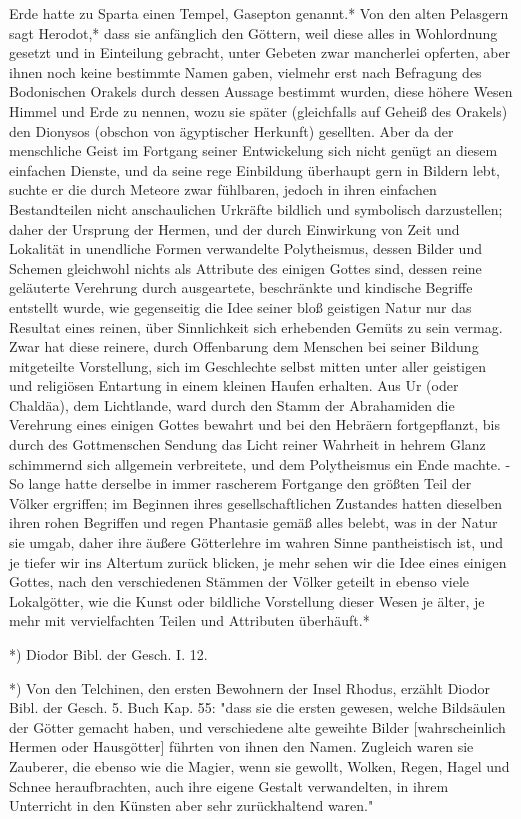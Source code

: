 \documentclass[a4paper, 11pt, oneside, polutonikogreek, german]{article}
\begin{document}
Erde hatte zu Sparta einen Tempel, Gasepton genannt.* Von den alten Pelasgern sagt Herodot,* dass sie anfänglich den Göttern, weil diese alles in Wohlordnung gesetzt und in Einteilung gebracht, unter Gebeten zwar mancherlei opferten, aber ihnen noch keine bestimmte Namen gaben, vielmehr erst nach Befragung des Bodonischen Orakels durch dessen Aussage bestimmt wurden, diese höhere Wesen Himmel und Erde zu nennen, wozu sie später (gleichfalls auf Geheiß des Orakels) den Dionysos (obschon von ägyptischer Herkunft) gesellten. Aber da der menschliche Geist im Fortgang seiner Entwickelung sich nicht genügt an diesem einfachen Dienste, und da seine rege Einbildung überhaupt gern in Bildern lebt, suchte er die durch Meteore zwar fühlbaren, jedoch in ihren einfachen Bestandteilen nicht anschaulichen Urkräfte bildlich und symbolisch darzustellen; daher der Ursprung der Hermen, und der durch Einwirkung von Zeit und Lokalität in unendliche Formen verwandelte Polytheismus, dessen Bilder und Schemen gleichwohl nichts als Attribute des einigen Gottes sind, dessen reine geläuterte Verehrung durch ausgeartete, beschränkte und kindische Begriffe entstellt wurde, wie gegenseitig die Idee seiner bloß geistigen Natur nur das Resultat eines reinen, über Sinnlichkeit sich erhebenden Gemüts zu sein vermag. Zwar hat diese reinere, durch Offenbarung dem Menschen bei seiner Bildung mitgeteilte Vorstellung, sich im Geschlechte selbst mitten unter aller geistigen und religiösen Entartung in einem kleinen Haufen erhalten. Aus Ur (oder Chaldäa), dem Lichtlande, ward durch den Stamm der Abrahamiden die Verehrung eines einigen Gottes bewahrt und bei den Hebräern fortgepflanzt, bis durch des Gottmenschen Sendung das Licht reiner Wahrheit in hehrem Glanz schimmernd sich allgemein verbreitete, und dem Polytheismus ein Ende machte. - So lange hatte derselbe in immer rascherem Fortgange den größten Teil der Völker ergriffen; im Beginnen ihres gesellschaftlichen Zustandes hatten dieselben ihren rohen Begriffen und regen Phantasie gemäß alles belebt, was in der Natur sie umgab, daher ihre äußere Götterlehre im wahren Sinne pantheistisch ist, und je tiefer wir ins Altertum zurück blicken, je mehr sehen wir die Idee eines einigen Gottes, nach den verschiedenen Stämmen der Völker geteilt in ebenso viele Lokalgötter, wie die Kunst oder bildliche Vorstellung dieser Wesen je älter, je mehr mit vervielfachten Teilen und Attributen überhäuft.*

*) Diodor Bibl. der Gesch. I. 12.

*) Von den Telchinen, den ersten Bewohnern der Insel Rhodus, erzählt Diodor Bibl. der Gesch. 5. Buch Kap. 55: "dass sie die ersten gewesen, welche Bildsäulen der Götter gemacht haben, und verschiedene alte geweihte Bilder [wahrscheinlich Hermen oder Hausgötter] führten von ihnen den Namen. Zugleich waren sie Zauberer, die ebenso wie die Magier, wenn sie gewollt, Wolken, Regen, Hagel und Schnee heraufbrachten, auch ihre eigene Gestalt verwandelten, in ihrem Unterricht in den Künsten aber sehr zurückhaltend waren."
\end{document}
